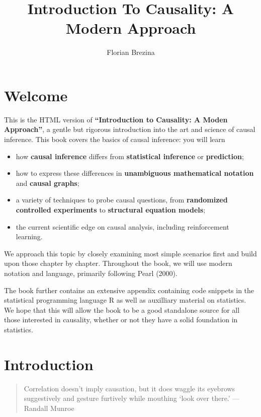 \documentclass[
]{book}
\title{Introduction To Causality: A Modern Approach}
\author{Florian Brezina}
\date{}
\providecommand{\tightlist}{%
  \setlength{\itemsep}{0pt}\setlength{\parskip}{0pt}}
\theoremstyle{definition}
\theoremstyle{definition}
\theoremstyle{definition}
\theoremstyle{remark}
\begin{document}
\maketitle

{
\setcounter{tocdepth}{1}
\tableofcontents
}
\hypertarget{welcome}{%
\chapter*{Welcome}\label{welcome}}

This is the HTML version of \textbf{``Introduction to Causality: A Moden Approach''}, a gentle but rigorous introduction into the art and science of causal inference. This book covers the basics of causal inference: you will learn

\begin{itemize}
\tightlist
\item
  how \textbf{causal inference} differs from \textbf{statistical inference} or \textbf{prediction};
\item
  how to express these differences in \textbf{unambiguous mathematical notation} and \textbf{causal graphs};
\item
  a variety of techniques to probe causal questions, from \textbf{randomized controlled experiments} to \textbf{structural equation models};
\item
  the current scientific edge on causal analysis, including reinforcement learning.
\end{itemize}

We approach this topic by closely examining most simple scenarios first and build upon those chapter by chapter. Throughout the book, we will use modern notation and language, primarily following Pearl (2000).

The book further contains an extensive appendix containing code snippets in the statistical programming language R as well as auxilliary material on statistics. We hope that this will allow the book to be a good standalone source for all those interested in causality, whether or not they have a solid foundation in statistics.

\hypertarget{introduction}{%
\chapter{Introduction}\label{introduction}}

\begin{quote}
Correlation doesn't imply causation, but it does waggle its eyebrows suggestively and gesture furtively while mouthing `look over there.'
--- Randall Munroe
\end{quote}
\end{document}
